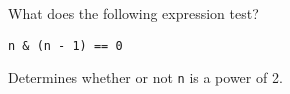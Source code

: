 \question What does the following expression test?
\begin{lstlisting}
n & (n - 1) == 0
\end{lstlisting}



\begin{solution}[0.25in]
Determines whether or not \texttt{n} is a power of 2.
\end{solution}